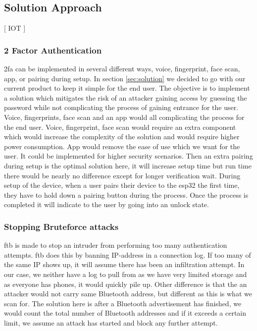\subsection{Solution Approach}
[ IOT ]
\newline
\subsubsection{2 Factor Authentication}
\gls{2fa} can be implemented in several different ways, voice, fingerprint, face scan, app, or pairing during setup. In section \ref{sec:solution} we decided to go with our current product to keep it simple for the end user. The objective is to implement a solution which mitigates the risk of an attacker gaining access by guessing the password while not complicating the process of gaining entrance for the user. Voice, fingerprints, face scan and an app would all complicating the process for the end user. Voice, fingerprint, face scan would require an extra component which would increase the complexity of the solution and would require higher power consumption. App would remove the ease of use which we want for the user. It could be implemented for higher security scenarios. Then an extra pairing during setup is the optimal solution here, it will increase setup time but run time there would be nearly no difference except for longer verification wait. During setup of the device, when a user pairs their device to the esp32 the first time, they have to hold down a pairing button during the process. Once the process is completed it will indicate to the user by going into an unlock state.

\subsubsection{Stopping Bruteforce attacks}
\gls{ftb} is made to stop an intruder from performing too many authentication attempts\cite{f2b}. \gls{ftb} does this by banning IP-address in a connection log\cite{f2bHowTo}. If too many of the same IP shows up, it will assume there has been an infiltration attempt. In our case, we neither have a log to pull from as we have very limited storage and as everyone has phones, it would quickly pile up. Other difference is that the an attacker would not carry same Bluetooth address, but different as this is what we scan for. The solution here is after a Bluetooth advertisement has finished, we would count the total number of Bluetooth addresses and if it exceeds a certain limit, we assume an attack has started and block any further attempt.

